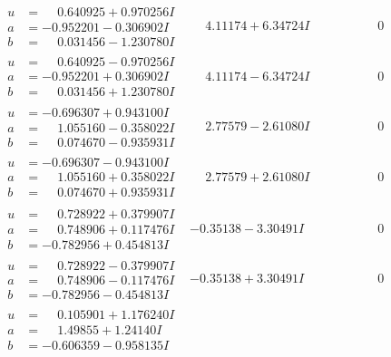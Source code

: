 \documentclass[1p]{elsarticle_modified}
\theoremstyle{definition}
\begin{document}
$$\begin{array}{c|c|c}
\begin{aligned}
u &= \phantom{-}0.640925 + 0.970256 I \\
a &= -0.952201 - 0.306902 I \\
b &= \phantom{-}0.031456 - 1.230780 I\end{aligned}
 & \phantom{-}4.11174 + 6.34724 I & \phantom{-0.000000 } 0 \\ \hline\begin{aligned}
u &= \phantom{-}0.640925 - 0.970256 I \\
a &= -0.952201 + 0.306902 I \\
b &= \phantom{-}0.031456 + 1.230780 I\end{aligned}
 & \phantom{-}4.11174 - 6.34724 I & \phantom{-0.000000 } 0 \\ \hline\begin{aligned}
u &= -0.696307 + 0.943100 I \\
a &= \phantom{-}1.055160 - 0.358022 I \\
b &= \phantom{-}0.074670 - 0.935931 I\end{aligned}
 & \phantom{-}2.77579 - 2.61080 I & \phantom{-0.000000 } 0 \\ \hline\begin{aligned}
u &= -0.696307 - 0.943100 I \\
a &= \phantom{-}1.055160 + 0.358022 I \\
b &= \phantom{-}0.074670 + 0.935931 I\end{aligned}
 & \phantom{-}2.77579 + 2.61080 I & \phantom{-0.000000 } 0 \\ \hline\begin{aligned}
u &= \phantom{-}0.728922 + 0.379907 I \\
a &= \phantom{-}0.748906 + 0.117476 I \\
b &= -0.782956 + 0.454813 I\end{aligned}
 & -0.35138 - 3.30491 I & \phantom{-0.000000 } 0 \\ \hline\begin{aligned}
u &= \phantom{-}0.728922 - 0.379907 I \\
a &= \phantom{-}0.748906 - 0.117476 I \\
b &= -0.782956 - 0.454813 I\end{aligned}
 & -0.35138 + 3.30491 I & \phantom{-0.000000 } 0 \\ \hline\begin{aligned}
u &= \phantom{-}0.105901 + 1.176240 I \\
a &= \phantom{-}1.49855 + 1.24140 I \\
b &= -0.606359 - 0.958135 I\end{aligned}

\end{array}$$
\end{document}
